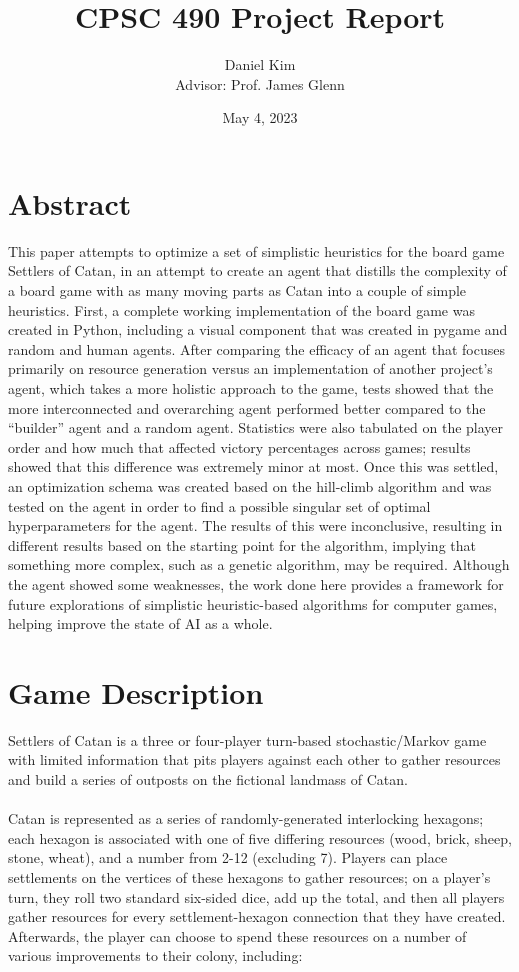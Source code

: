 \documentclass[a4paper, 11pt]{article}
\title{CPSC 490 Project Report}
\author{Daniel Kim\\{Advisor: Prof. James Glenn}}
\date{May 4, 2023}
\begin{document}
\maketitle

\section{Abstract}
This paper attempts to optimize a set of simplistic heuristics for the board game Settlers of Catan, in an attempt to create an agent that distills the complexity of a board game with as many moving parts as Catan into a couple of simple heuristics. First, a complete working implementation of the board game was created in Python, including a visual component that was created in pygame and random and human agents. After comparing the efficacy of an agent that focuses primarily on resource generation versus an implementation of another project's agent, which takes a more holistic approach to the game, tests showed that the more interconnected and overarching agent performed better compared to the “builder” agent and a random agent. Statistics were also tabulated on the player order and how much that affected victory percentages across games; results showed that this difference was extremely minor at most. Once this was settled, an optimization schema was created based on the hill-climb algorithm and was tested on the agent in order to find a possible singular set of optimal hyperparameters for the agent. The results of this were inconclusive, resulting in different results based on the starting point for the algorithm, implying that something more complex, such as a genetic algorithm, may be required. Although the agent showed some weaknesses, the work done here provides a framework for future explorations of simplistic heuristic-based algorithms for computer games, helping improve the state of AI as a whole.

\section{Game Description}

Settlers of Catan is a three or four-player turn-based stochastic/Markov game with limited information that pits players against each other to gather resources and build a series of outposts on the fictional landmass of Catan. 
\\ \\
\noindent Catan is represented as a series of randomly-generated interlocking hexagons; each hexagon is associated with one of five differing resources (wood, brick, sheep, stone, wheat), and a number from 2-12 (excluding 7). Players can place settlements on the vertices of these hexagons to gather resources; on a player's turn, they roll two standard six-sided dice, add up the total, and then all players gather resources for every settlement-hexagon connection that they have created. Afterwards, the player can choose to spend these resources on a number of various improvements to their colony, including:
\end{document}
